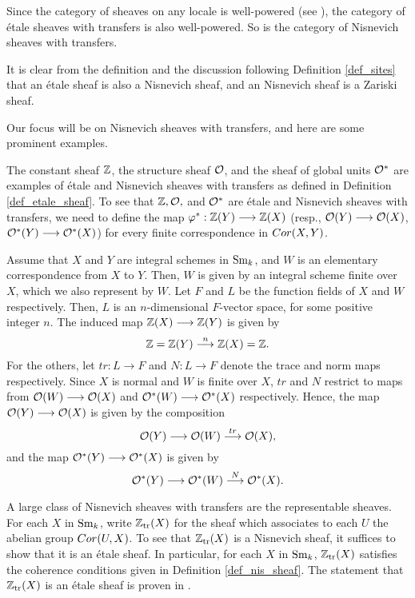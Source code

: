 Since the category of sheaves on any locale is well-powered
(see \cite[2.3.7]{Bo}), the category of \'etale sheaves 
with transfers is also well-powered. So is the category of 
Nisnevich sheaves with transfers.

It is clear from the definition and the discussion 
following Definition \ref{def_sites} that an \'etale sheaf is also 
a Nisnevich sheaf, and an Nisnevich sheaf is a Zariski sheaf.

Our focus will be on Nisnevich sheaves with transfers, and here 
are some prominent examples.

\begin{ex}\label{ex_Z_O_Ostar}
The constant sheaf $\mathbb{Z}$, the structure sheaf $\mathcal{O}$, and the sheaf
of global units $\mathcal{O}^*$ are examples of \'etale and Nisnevich sheaves
with transfers as defined in Definition
\ref{def_etale_sheaf}. To see that $\mathbb{Z}, \mathcal{O},$ and $\mathcal{O}^*$ are \'etale 
and Nisnevich sheaves with transfers, we need to define the map 
$\varphi^*: \mathbb{Z}(Y) \longrightarrow \mathbb{Z}(X)$ (resp., $\mathcal{O}(Y) \longrightarrow \mathcal{O}(X)$, $\mathcal{O}^*(Y) \longrightarrow 
\mathcal{O}^*(X)$) for every finite correspondence in $Cor(X, Y)$.

Assume that $X$ and $Y$ are integral schemes
in $\mathrm{Sm}_{k}$, and $W$ is an elementary correspondence from $X$ to $Y$. 
Then, $W$ is given by an integral scheme finite over $X$, which we 
also represent by $W$. Let $F$ and $L$ be the function fields of 
$X$ and $W$ respectively. Then, $L$ is an $n$-dimensional
$F$-vector space, for some positive integer $n$. The induced 
map $\mathbb{Z}(X) \longrightarrow \mathbb{Z}(Y)$ is given by
\[
\mathbb{Z} = \mathbb{Z}(Y) \stackrel{n}{\longrightarrow} \mathbb{Z}(X) = \mathbb{Z}.
\]
For the others, let $tr: L \to F$ and $N: L \to F$ denote the 
trace and norm maps respectively. Since $X$ is normal and $W$ is
finite over $X$, $tr$ and $N$ restrict to maps from $\mathcal{O}(W) \longrightarrow 
\mathcal{O}(X)$ and $\mathcal{O}^*(W) \longrightarrow \mathcal{O}^*(X)$ respectively. Hence, the map $\mathcal{O}(Y) 
\longrightarrow \mathcal{O}(X)$ is given by the composition
\[
\mathcal{O}(Y) \longrightarrow \mathcal{O}(W) \stackrel{tr}{\longrightarrow} \mathcal{O}(X),
\]
and the map $\mathcal{O}^*(Y) \longrightarrow \mathcal{O}^*(X)$ is given by
\[
\mathcal{O}^*(Y) \longrightarrow \mathcal{O}^*(W) \stackrel{N}{\longrightarrow} \mathcal{O}^*(X).
\]
\end{ex}

\begin{ex}\label{ex_ZtrX}
A large class of Nisnevich sheaves with transfers are the 
representable sheaves. For each $X$ in $\mathrm{Sm}_{k}$, write $\mathbb{Z}_{\mathrm{tr}}(X)$
for the sheaf which associates to each $U$ the abelian group
$Cor(U, X)$. To see that $\mathbb{Z}_{\mathrm{tr}}(X)$ is a Nisnevich sheaf, it
suffices to show that it is an \'etale sheaf. In particular,
for each $X$ in $\mathrm{Sm}_{k}$, $\mathbb{Z}_{\mathrm{tr}}(X)$ satisfies the coherence 
conditions given in Definition \ref{def_nis_sheaf}. The statement that
$\mathbb{Z}_{\mathrm{tr}}(X)$ is an \'etale sheaf is proven in \cite[6.2]{MVW}.
\end{ex}

